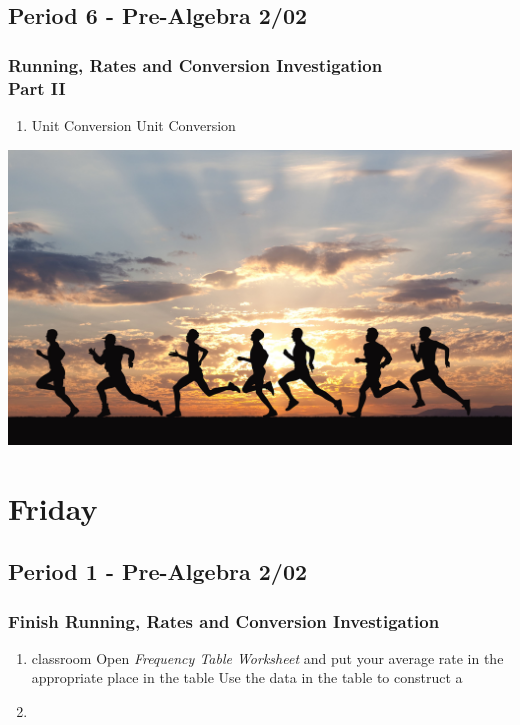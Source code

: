   \subsection[PA2/02]{Period 6 - Pre-Algebra 2/02}
  \begin{frame}[label=PA2_02]
  	\frametitle{Running, Rates and Conversion Investigation \\ Part II}

       \begin{enumerate}
   	   	    \item Unit Conversion  
   	   	    \rightarrowitem Unit Conversion  
   	     \end{enumerate}  	 
   	  	\vspace{-12pt}
   	  	\begin{center}
   	  		\includegraphics[width=0.7\linewidth]{Images/running}
   	  	\end{center}      
   	  	\vspace{-20pt}
  	 
    \end{frame}
	  
   	 \section[Fri]{Friday}
         \subsection[PA2/02]{Period 1 - Pre-Algebra 2/02}
         \begin{frame}[label=PA2_02]
           	\frametitle{Finish Running, Rates and Conversion Investigation}
           	
          \begin{enumerate}
   	   	   \item {} classroom  
   	   	   \rightarrowitem Open \emph{Frequency Table Worksheet} and put your average rate in the appropriate place in the table
   	   	   \rightarrowitem Use the data in the table to construct a 
   	   	   \item \mangahighlogo
   	     \end{enumerate}           	
           	
         \end{frame}
